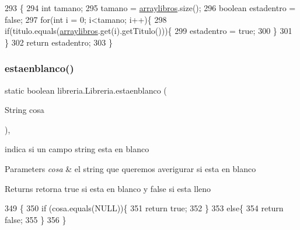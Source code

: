 \begin{DoxyCode}
293                                                            \{
294          \textcolor{keywordtype}{int} tamano;
295          tamano = \mbox{\hyperlink{classlibreria_1_1_libreria_aa55c2bad2db92eb94ea1ba9c6997f47d}{arraylibros}}.size();
296          \textcolor{keywordtype}{boolean} estadentro = \textcolor{keyword}{false};
297          \textcolor{keywordflow}{for}(\textcolor{keywordtype}{int} i = 0; i<tamano; i++)\{
298              \textcolor{keywordflow}{if}(titulo.equals(\mbox{\hyperlink{classlibreria_1_1_libreria_aa55c2bad2db92eb94ea1ba9c6997f47d}{arraylibros}}.get(i).getTitulo()))\{
299                  estadentro = \textcolor{keyword}{true};
300              \}
301          \}
302          \textcolor{keywordflow}{return} estadentro;
303      \}
\end{DoxyCode}
\mbox{\label{classlibreria_1_1_libreria_afca98a0ea16507ff5cc9bc0dde706abb}} 
\subsubsection{\texorpdfstring{estaenblanco()}{estaenblanco()}}
{\footnotesize\ttfamily static boolean libreria.\+Libreria.\+estaenblanco (\begin{DoxyParamCaption}\item[{String}]{cosa }\end{DoxyParamCaption})\hspace{0.3cm}{\ttfamily [inline]}, {\ttfamily [static]}}

indica si un campo string esta en blanco 
\begin{DoxyParams}{Parameters}
{\em cosa} & el string que queremos averigurar si esta en blanco \\
\hline
\end{DoxyParams}
\begin{DoxyReturn}{Returns}
retorna true si esta en blanco y false si esta lleno 
\end{DoxyReturn}

\begin{DoxyCode}
349                                                     \{
350          \textcolor{keywordflow}{if} (cosa.equals(NULL))\{
351              \textcolor{keywordflow}{return} \textcolor{keyword}{true};
352          \}
353          \textcolor{keywordflow}{else}\{
354              \textcolor{keywordflow}{return} \textcolor{keyword}{false};
355          \}
356      \}
\end{DoxyCode}
\mbox{\label{classlibreria_1_1_libreria_a706ac513e37d19235273ec939e4fa8ac}} 
